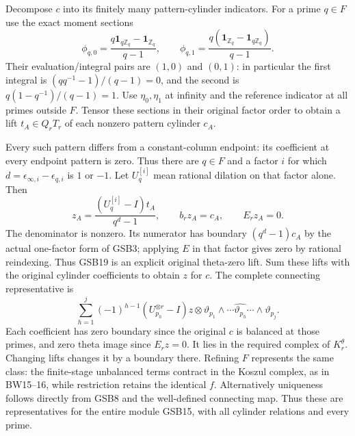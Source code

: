 Decompose $c$ into its finitely many pattern-cylinder indicators.
For a prime $q\in F$ use the exact moment sections
\begin{equation}\tag{GSB18}
\phi_{q,0}=\frac{q\mathbf1_{q\mathbb Z_q}-\mathbf1_{\mathbb Z_q}}{q-1},
\qquad
\phi_{q,1}=\frac{q(\mathbf1_{\mathbb Z_q}-\mathbf1_{q\mathbb Z_q})}{q-1}.
\end{equation}
Their evaluation/integral pairs are $(1,0)$ and $(0,1)$:
in particular the first integral is $(q q^{-1}-1)/(q-1)=0$,
and the second is $q(1-q^{-1})/(q-1)=1$.
Use $\eta_0,\eta_1$ at infinity and the reference indicator at
all primes outside $F$. Tensor these sections in their original
factor order to obtain a lift $t_A\in Q_rT_r$ of each nonzero
pattern cylinder $c_A$.

Every such pattern differs from a constant-column endpoint: its
coefficient at every endpoint pattern is zero. Thus there are
$q\in F$ and a factor $i$ for which
$d=\epsilon_{\infty,i}-\epsilon_{q,i}$ is $1$ or $-1$.
Let $U_q^{[i]}$ mean rational dilation on that factor alone.
Then
\begin{equation}\tag{GSB19}
z_A=\frac{(U_q^{[i]}-I)t_A}{q^d-1},\qquad
b_rz_A=c_A,\qquad E_rz_A=0.
\end{equation}
The denominator is nonzero. Its numerator has boundary
$(q^d-1)c_A$ by the actual one-factor form of GSB3; applying
$E$ in that factor gives zero by rational reindexing. Thus
GSB19 is an explicit original theta-zero lift. Sum these lifts
with the original cylinder coefficients to obtain $z$ for $c$.
The complete connecting representative is
\begin{equation}\tag{GSB20}
\sum_{h=1}^j(-1)^{h-1}(U_{p_h}^{\otimes r}-I)z
 \otimes\vartheta_{p_1}\wedge\cdots
       \widehat{\vartheta_{p_h}}\cdots\wedge\vartheta_{p_j}.
\end{equation}
Each coefficient has zero boundary since the original $c$ is
balanced at those primes, and zero theta image since $E_rz=0$.
It lies in the required complex of $K_r^\theta$. Changing lifts
changes it by a boundary there. Refining $F$ represents the same
class: the finite-stage unbalanced terms contract in the Koszul
complex, as in BW15--16, while restriction retains the identical
$f$. Alternatively uniqueness follows directly from GSB8 and the
well-defined connecting map. Thus these are representatives for
the entire module GSB15, with all cylinder relations and every prime.

